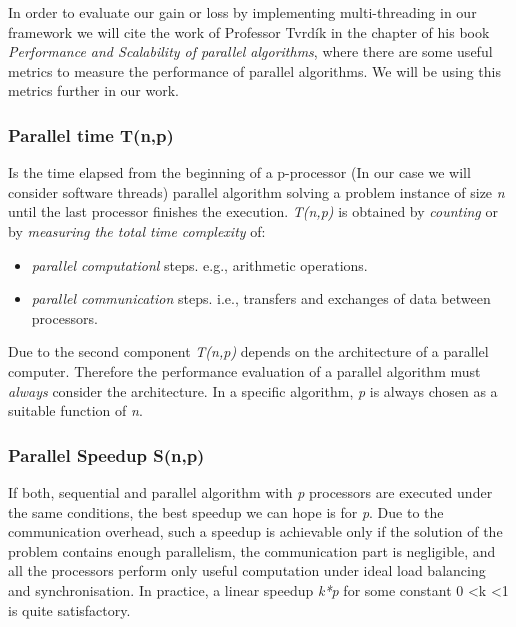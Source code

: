 In order to evaluate our gain or loss by implementing multi-threading in our framework we will cite the work of Professor Tvrdík \cite{T2011} in the chapter of his book \emph{Performance and Scalability of parallel algorithms}, where there are some useful metrics to measure the performance of parallel algorithms. We will be using this metrics further in our work.


 \subsubsection{Parallel time T(n,p)}\label{ParTime}
Is the time elapsed from the beginning of a p-processor (In our case we will consider software threads) parallel algorithm solving a problem instance of size \emph{n} until the last processor finishes the execution. \emph{T(n,p)} is obtained by \emph{counting} or by \emph{measuring the total time complexity} of:
	\begin{itemize}
		\item \emph{parallel computationl} steps. e.g., arithmetic operations.
		\item \emph{parallel communication} steps. i.e., transfers and exchanges of data between processors.
	\end{itemize}	
	Due to the second component \emph{T(n,p)} depends on the architecture of a parallel computer. Therefore the performance evaluation of a parallel algorithm must \emph{always} consider the architecture. In a specific algorithm, \emph{p} is always chosen as a suitable function of \emph{n}.

 \subsubsection{Parallel Speedup S(n,p)}\label{ParSpeedup}
If both, sequential and parallel algorithm with \emph{p} processors are executed under the same conditions, the best speedup we can hope is for \emph{p}. Due to the communication overhead, such a speedup is achievable only if the solution of the problem contains enough parallelism, the communication part is negligible, and all the processors perform only useful computation under ideal load balancing and synchronisation. In practice, a linear speedup \emph{k*p} for some constant 0 \textless k \textless 1 is quite satisfactory.
	

